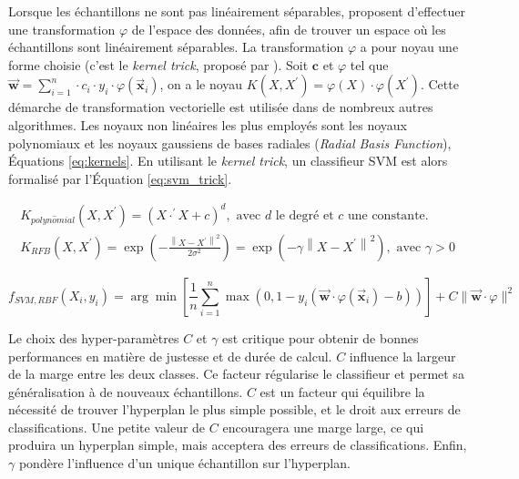 Lorsque les échantillons ne sont pas linéairement séparables, \citeauthor{boser_training_1992} \cite{boser_training_1992} proposent d'effectuer une transformation $\varphi$ de l'espace des données, afin de trouver un espace où les échantillons sont linéairement séparables.
La transformation $\varphi$ a pour noyau une forme choisie (c'est le \textit{kernel trick}, proposé par \citeauthor{aizerman_theoretical_1964} \cite{aizerman_theoretical_1964}).
Soit $\mathbf{c}$ et $\varphi$ tel que $\vec{\mathbf{w}}=\sum_{i=1}^{n} \cdot c_{i} \cdot y_{i} \cdot \varphi\left(\vec{\mathbf{x}}_{i}\right)$, on a le noyau $K\left(X, X^{\prime}\right) = \varphi \left(X\right) \cdot \varphi\left(X^{\prime}\right)$.
Cette démarche de transformation vectorielle est utilisée dans de nombreux autres algorithmes.
Les noyaux non linéaires les plus employés sont les noyaux polynomiaux et les noyaux gaussiens de bases radiales (\textit{Radial Basis Function}), Équations \ref{eq:kernels}.
En utilisant le \textit{kernel trick}, un classifieur SVM est alors formalisé par l'Équation \ref{eq:svm_trick}.

\begin{equation} \label{eq:kernels}
\begin{split}
K_{polyn\hat{o}mial}\left(X, X^{\prime}\right) = \left(X \cdot ^{\prime} X + c\right)^{d}, \text{ avec } d \text{ le degré et } c \text{ une constante}.
\\
K_{RFB}\left(X, X^{\prime}\right) = \exp \left(-\frac{\left\|X-X^{\prime}\right\|^{2}}{2 \sigma^{2}}\right) = \exp \left(-\gamma\left\|X-X^{\prime}\right\|^{2}\right), \text{ avec } \gamma > 0
\end{split}
\end{equation}

\begin{equation} \label{eq:svm_trick}
f_{SVM,RBF}(X_i, y_i) = \arg \min \left[\frac{1}{n} \sum_{i=1}^{n} \max \left(0, 1-y_{i}\left(\vec{\mathbf{w}} \cdot \varphi(\vec{\mathbf{x}}_{i})-b\right)\right)\right]+ C \|\vec{\mathbf{w}} \cdot \varphi \|^{2}
\end{equation}

Le choix des hyper-paramètres $C$ et $\gamma$ est critique pour obtenir de bonnes performances en matière de justesse et de durée de calcul.
$C$ influence la largeur de la marge entre les deux classes.
Ce facteur régularise le classifieur et permet sa généralisation à de nouveaux échantillons.
$C$ est un facteur qui équilibre la nécessité de trouver l'hyperplan le plus simple possible, et le droit aux erreurs de classifications.
Une petite valeur de $C$ encouragera une marge large, ce qui produira un hyperplan simple, mais acceptera des erreurs de classifications.
Enfin, $\gamma$ pondère l'influence d'un unique échantillon sur l'hyperplan.

